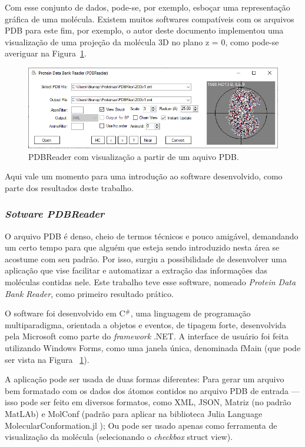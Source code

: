 \documentclass[a4paper,12pt]{article}
\begin{document}
	Com esse conjunto de dados, pode-se, por exemplo, esboçar uma representação gráfica de uma molécula. Existem muitos softwares compatíveis com os arquivos PDB para este fim, por exemplo, o autor deste documento implementou uma visualização de uma projeção da molécula 3D no plano z = 0, como pode-se averiguar na Figura~\ref{fig:molproj}.
	
	\begin{figure}[H]
		\begin{center}
			\includegraphics[width=1\linewidth]{molproj.png}
		\end{center}
		\caption{PDBReader com visualização a partir de um aquivo PDB.}
		\label{fig:molproj}
	\end{figure}
	
	
	Aqui vale um momento para uma introdução ao software desenvolvido, como parte dos resultados deste trabalho. 
	\subsubsection{\textit{Sotware PDBReader}}
	O arquivo PDB é denso, cheio de termos técnicos e pouco amigável, demandando um certo tempo para que alguém que esteja sendo introduzido nesta área se acostume com seu padrão. Por isso, surgiu a possibilidade de desenvolver uma aplicação que vise facilitar e automatizar a extração das informações das moléculas contidas nele. Este trabalho teve esse software, nomeado \textit{Protein Data Bank Reader}, como primeiro resultado prático.
	
	O software foi desenvolvido em C${^\#}$, uma linguagem de programação multiparadigma, orientada a objetos e eventos, de tipagem forte, desenvolvida pela Microsoft como parte do \textit{framework }.NET. A interface de usuário foi feita utilizando Windows Forms, como uma janela única, denominada fMain (que pode ser vista na Figura ~\ref{fig:molproj}).
	
	A aplicação pode ser usada de duas formas diferentes: Para gerar um arquivo bem formatado com os dados dos átomos contidos no arquivo PDB de entrada --- isso pode ser feito em diversos formatos, como XML, JSON, Matriz (no padrão MatLAb) e MolConf (padrão para aplicar na biblioteca Julia Language MolecularConformation.jl \cite{emersonMolConf}); Ou pode ser usado apenas como ferramenta de visualização da molécula (selecionando o \textit{checkbox} struct view).
	
\end{document}
